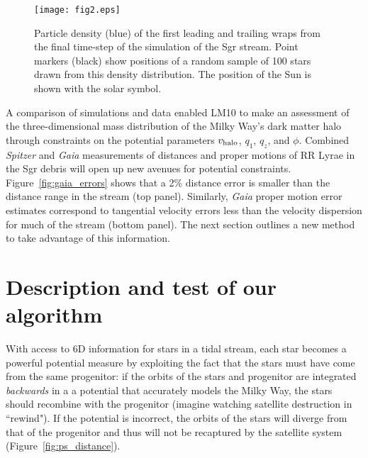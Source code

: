 \documentclass{emulateapj}
\begin{document}
\begin{figure}[h]
\begin{center}
\texttt{[image: fig2.eps]}
\caption{ Particle density (blue) of the first leading and trailing wraps from the final time-step of the \citet{law10} simulation of the Sgr stream. Point markers (black) show positions of a random sample of 100 stars drawn from this density distribution. The position of the Sun is shown with the solar symbol. }\label{fig:lm10}
\end{center}
\end{figure}

A comparison of simulations and data enabled LM10 to make an assessment of the three-dimensional 
mass distribution of the Milky Way's dark matter
halo through constraints on the potential parameters $v_{\rm halo}$, $q_1$, $q_z$, and $\phi$. Combined {\it Spitzer} and {\it Gaia} measurements of distances and proper motions
of RR Lyrae in the Sgr debris will open up new avenues for potential constraints. Figure~\ref{fig:gaia_errors} shows that a 2\% distance error is smaller than the 
distance range in the stream (top panel). Similarly, {\it Gaia} proper motion
error estimates correspond to tangential velocity errors less than the velocity
dispersion for much of the stream (bottom panel). The next section outlines a 
new method to take advantage of this information. 


\section{Description and test of our algorithm}
\label{sec:method}
With access to 6D information for stars in a tidal
stream, each star becomes a powerful potential
measure by exploiting the fact that the stars must have come from the
same progenitor: if the orbits of the stars and progenitor are integrated 
\emph{backwards} in a a potential that accurately models the Milky Way, the stars
should recombine with the progenitor (imagine watching satellite destruction in ``rewind"). If the potential is incorrect,
the orbits of the stars will diverge from that of the progenitor and
thus will not be recaptured by the satellite system (Figure~\ref{fig:ps_distance}).
\end{document}
